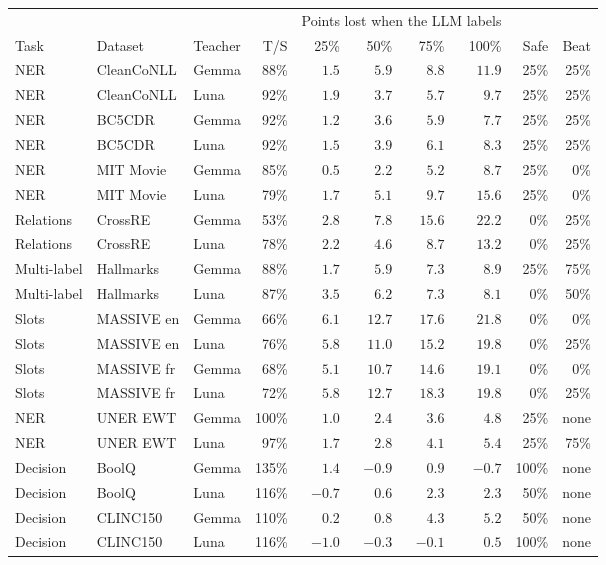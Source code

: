 \begin{tabular}{lllrrrrrrr}
\toprule
 & & & & \multicolumn{4}{c}{Points lost when the LLM labels} & & \\
\cmidrule(lr){5-8}
Task & Dataset & Teacher & T/S & 25\% & 50\% & 75\% & 100\% & Safe & Beat \\
\midrule
NER & CleanCoNLL & Gemma & 88\% & $1.5$ & $5.9$ & $8.8$ & $11.9$ & 25\% & 25\% \\
NER & CleanCoNLL & Luna & 92\% & $1.9$ & $3.7$ & $5.7$ & $9.7$ & 25\% & 25\% \\
NER & BC5CDR & Gemma & 92\% & $1.2$ & $3.6$ & $5.9$ & $7.7$ & 25\% & 25\% \\
NER & BC5CDR & Luna & 92\% & $1.5$ & $3.9$ & $6.1$ & $8.3$ & 25\% & 25\% \\
NER & MIT Movie & Gemma & 85\% & $0.5$ & $2.2$ & $5.2$ & $8.7$ & 25\% & 0\% \\
NER & MIT Movie & Luna & 79\% & $1.7$ & $5.1$ & $9.7$ & $15.6$ & 25\% & 0\% \\
Relations & CrossRE & Gemma & 53\% & $2.8$ & $7.8$ & $15.6$ & $22.2$ & 0\% & 25\% \\
Relations & CrossRE & Luna & 78\% & $2.2$ & $4.6$ & $8.7$ & $13.2$ & 0\% & 25\% \\
Multi-label & Hallmarks & Gemma & 88\% & $1.7$ & $5.9$ & $7.3$ & $8.9$ & 25\% & 75\% \\
Multi-label & Hallmarks & Luna & 87\% & $3.5$ & $6.2$ & $7.3$ & $8.1$ & 0\% & 50\% \\
Slots & MASSIVE en & Gemma & 66\% & $6.1$ & $12.7$ & $17.6$ & $21.8$ & 0\% & 0\% \\
Slots & MASSIVE en & Luna & 76\% & $5.8$ & $11.0$ & $15.2$ & $19.8$ & 0\% & 25\% \\
Slots & MASSIVE fr & Gemma & 68\% & $5.1$ & $10.7$ & $14.6$ & $19.1$ & 0\% & 0\% \\
Slots & MASSIVE fr & Luna & 72\% & $5.8$ & $12.7$ & $18.3$ & $19.8$ & 0\% & 25\% \\
NER & UNER EWT & Gemma & 100\% & $1.0$ & $2.4$ & $3.6$ & $4.8$ & 25\% & none \\
NER & UNER EWT & Luna & 97\% & $1.7$ & $2.8$ & $4.1$ & $5.4$ & 25\% & 75\% \\
Decision & BoolQ & Gemma & 135\% & $1.4$ & $-0.9$ & $0.9$ & $-0.7$ & 100\% & none \\
Decision & BoolQ & Luna & 116\% & $-0.7$ & $0.6$ & $2.3$ & $2.3$ & 50\% & none \\
Decision & CLINC150 & Gemma & 110\% & $0.2$ & $0.8$ & $4.3$ & $5.2$ & 50\% & none \\
Decision & CLINC150 & Luna & 116\% & $-1.0$ & $-0.3$ & $-0.1$ & $0.5$ & 100\% & none \\
\bottomrule
\end{tabular}
